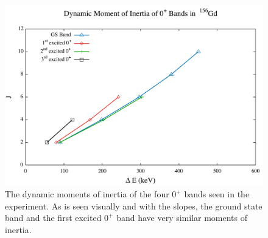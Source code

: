 \begin{figure}[!]
    \centering
    \includegraphics[scale=0.45]{156GdTablesAndFigs/156_Dynamic0.pdf}
    \caption{The dynamic moments of inertia of the four $0^+$ bands seen in the experiment. As is seen visually and with the slopes, the ground state band and the first excited $0^+$ band have very similar moments of inertia.}
    \label{fig:156_Dynamic0}
\end{figure}